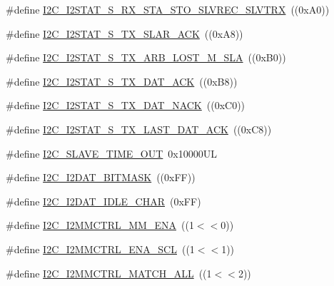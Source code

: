 \begin{DoxyCompactItemize}
\item 
\#define \hyperlink{group___i2_c___private___macros_ga7afe9f0e54aeb9ce8428c0adeb3c3274}{\-I2\-C\-\_\-\-I2\-S\-T\-A\-T\-\_\-\-S\-\_\-\-R\-X\-\_\-\-S\-T\-A\-\_\-\-S\-T\-O\-\_\-\-S\-L\-V\-R\-E\-C\-\_\-\-S\-L\-V\-T\-R\-X}~((0x\-A0))
\item 
\#define \hyperlink{group___i2_c___private___macros_gae6dcbdd1f01f7ebf3595722770e3b7b6}{\-I2\-C\-\_\-\-I2\-S\-T\-A\-T\-\_\-\-S\-\_\-\-T\-X\-\_\-\-S\-L\-A\-R\-\_\-\-A\-C\-K}~((0x\-A8))
\item 
\#define \hyperlink{group___i2_c___private___macros_gac71ac23a80e1bdb700a2c37170031107}{\-I2\-C\-\_\-\-I2\-S\-T\-A\-T\-\_\-\-S\-\_\-\-T\-X\-\_\-\-A\-R\-B\-\_\-\-L\-O\-S\-T\-\_\-\-M\-\_\-\-S\-L\-A}~((0x\-B0))
\item 
\#define \hyperlink{group___i2_c___private___macros_gaeb92fe85cc3f6c813cb91685234ac08c}{\-I2\-C\-\_\-\-I2\-S\-T\-A\-T\-\_\-\-S\-\_\-\-T\-X\-\_\-\-D\-A\-T\-\_\-\-A\-C\-K}~((0x\-B8))
\item 
\#define \hyperlink{group___i2_c___private___macros_gad9cdcd8c06924252a2ad9baced97d838}{\-I2\-C\-\_\-\-I2\-S\-T\-A\-T\-\_\-\-S\-\_\-\-T\-X\-\_\-\-D\-A\-T\-\_\-\-N\-A\-C\-K}~((0x\-C0))
\item 
\#define \hyperlink{group___i2_c___private___macros_ga3e4522387958da1da6017a6e48a0daad}{\-I2\-C\-\_\-\-I2\-S\-T\-A\-T\-\_\-\-S\-\_\-\-T\-X\-\_\-\-L\-A\-S\-T\-\_\-\-D\-A\-T\-\_\-\-A\-C\-K}~((0x\-C8))
\item 
\#define \hyperlink{group___i2_c___private___macros_ga33116b352c72ef28879812c66387f17a}{\-I2\-C\-\_\-\-S\-L\-A\-V\-E\-\_\-\-T\-I\-M\-E\-\_\-\-O\-U\-T}~0x10000\-U\-L
\item 
\#define \hyperlink{group___i2_c___private___macros_gac66b7c81c93cc59f69d204b4eb7d639b}{\-I2\-C\-\_\-\-I2\-D\-A\-T\-\_\-\-B\-I\-T\-M\-A\-S\-K}~((0x\-F\-F))
\item 
\#define \hyperlink{group___i2_c___private___macros_ga5b04af302e0e4007df123dff0328ac5e}{\-I2\-C\-\_\-\-I2\-D\-A\-T\-\_\-\-I\-D\-L\-E\-\_\-\-C\-H\-A\-R}~(0x\-F\-F)
\item 
\#define \hyperlink{group___i2_c___private___macros_ga8dc8fa566a5113c3e1b35c0580d90d9f}{\-I2\-C\-\_\-\-I2\-M\-M\-C\-T\-R\-L\-\_\-\-M\-M\-\_\-\-E\-N\-A}~((1$<$$<$0))
\item 
\#define \hyperlink{group___i2_c___private___macros_gabf11567c27c48d795ba0f92cf636dab6}{\-I2\-C\-\_\-\-I2\-M\-M\-C\-T\-R\-L\-\_\-\-E\-N\-A\-\_\-\-S\-C\-L}~((1$<$$<$1))
\item 
\#define \hyperlink{group___i2_c___private___macros_gac7dd5efba503dd79c6b42f3575f70307}{\-I2\-C\-\_\-\-I2\-M\-M\-C\-T\-R\-L\-\_\-\-M\-A\-T\-C\-H\-\_\-\-A\-L\-L}~((1$<$$<$2))
$$
\end{DoxyCompactItemize}
